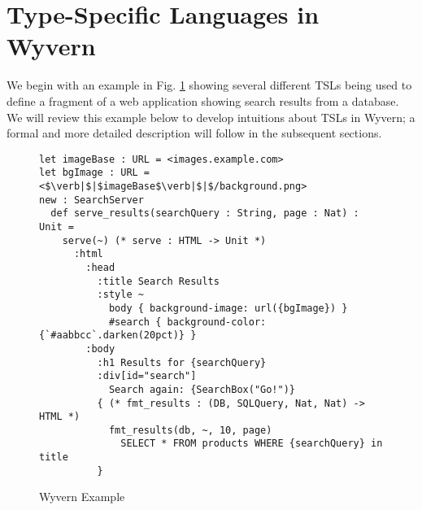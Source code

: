 
\section{Type-Specific Languages in Wyvern}
\label{s:motivation}
We begin with an example in Fig. \ref{f-example} showing several different TSLs being used to define a fragment of a web application showing search results from a database. We will review this example below to develop intuitions about TSLs in Wyvern; a formal and more detailed description will follow in the subsequent sections.
\begin{figure}[t]
\begin{lstlisting}
let imageBase : URL = <images.example.com>
let bgImage : URL = <$\verb|$|$imageBase$\verb|$|$/background.png>
new : SearchServer
  def serve_results(searchQuery : String, page : Nat) : Unit =
    serve(~) (* serve : HTML -> Unit *)
      :html
        :head
          :title Search Results
          :style ~
            body { background-image: url({bgImage}) }
            #search { background-color: {`#aabbcc`.darken(20pct)} }
        :body
          :h1 Results for {searchQuery}
          :div[id="search"]
            Search again: {SearchBox("Go!")}
          { (* fmt_results : (DB, SQLQuery, Nat, Nat) -> HTML *)
            fmt_results(db, ~, 10, page)
              SELECT * FROM products WHERE {searchQuery} in title
          }
\end{lstlisting}
\vspace{-8px}
\caption{Wyvern Example }
\label{f-example}
\vspace{-10px}
\end{figure}
